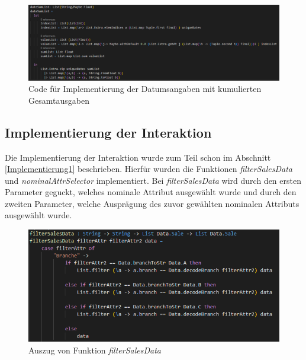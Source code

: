 \documentclass[usegeometry=true]{scrartcl}
\begin{document}
\begin{figure} [H]
	\begin{center}
		\includegraphics[width=17cm]{IMG/dateSumList}
		\caption{Code für Implementierung der Datumsangaben mit kumulierten Gesamtausgaben}
		\label{fig:Datum_Gesamtausgaben}
	\end{center}
\end{figure}

\subsection{Implementierung der Interaktion}
Die Implementierung der Interaktion wurde zum Teil schon im Abschnitt \ref{Implementierung1} beschrieben. Hierfür wurden die Funktionen \textit{filterSalesData} und
\textit{nominalAttrSelector} implementiert. Bei \textit{filterSalesData} wird durch den ersten Parameter geguckt, welches nominale Attribut ausgewählt wurde und durch den zweiten
Parameter, welche Ausprägung des zuvor gewählten nominalen Attributs ausgewählt wurde.

\begin{figure} [H]
	\begin{center}
		\includegraphics[width=14cm]{IMG/filterSalesData}
		\caption{Auszug von Funktion \textit{filterSalesData}}
		\label{fig:filterSalesData}
	\end{center}
\end{figure}
\end{document}
